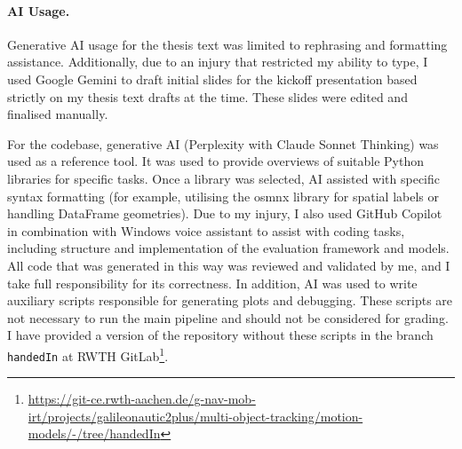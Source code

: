 \paragraph{AI Usage.}
Generative AI usage for the thesis text was limited to rephrasing and formatting assistance. %
Additionally, due to an injury that restricted my ability to type, I used Google Gemini to draft initial slides for the kickoff presentation based strictly on my thesis text drafts at the time. These slides were edited and finalised manually. 

 For the codebase, generative AI (Perplexity with Claude Sonnet Thinking) was used as a reference tool. It was used to provide overviews of suitable Python libraries for specific tasks. Once a library was selected, AI assisted with specific syntax formatting (for example, utilising the osmnx library for spatial labels or handling DataFrame geometries).
Due to my injury, I also used GitHub Copilot in combination with Windows voice assistant to assist with coding tasks, including structure and implementation of the evaluation framework and models. All code that was generated in this way was reviewed and validated by me, and I take full responsibility for its correctness.
In addition, AI was used to write auxiliary scripts responsible for generating plots and debugging. These scripts are not necessary to run the main pipeline and should not be considered for grading.
I have provided a version of the repository without these scripts in the branch \texttt{handedIn} at RWTH GitLab\footnote{\url{https://git-ce.rwth-aachen.de/g-nav-mob-irt/projects/galileonautic2plus/multi-object-tracking/motion-models/-/tree/handedIn}}.